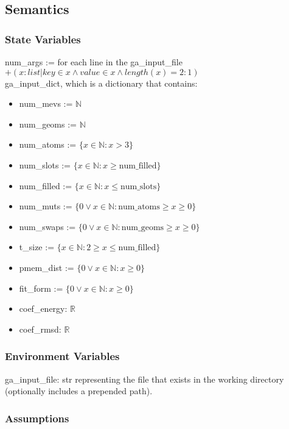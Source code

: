 \documentclass[12pt, titlepage]{article}
\begin{document}
\subsection{Semantics}

\subsubsection{State Variables}

\noindent num\_args := for each line in the ga\_input\_file $+(x : list | key 
\in x \land value \in x \land 
length(x) = 2 : 1)$ \\

\noindent ga\_input\_dict, which is a dictionary that contains:
\begin{itemize}
\item num\_mevs := $\mathbb{N}$
\item num\_geoms := $\mathbb{N}$
\item num\_atoms := $\{x \in \mathbb{N}: x > 3\}$
\item num\_slots := $\{x \in \mathbb{N}: x \geq \text{num\_filled} \}$
\item num\_filled := $\{x \in \mathbb{N}: x \leq \text{num\_slots}\}$
\item num\_muts := $\{0 \lor x \in \mathbb{N}: \text{num\_atoms} \geq x \geq 
0\}$
\item num\_swaps := $\{0 \lor x \in \mathbb{N}: \text{num\_geoms} \geq x \geq 
0\}$
\item t\_size := $\{x \in \mathbb{N}: 2 \geq x \leq \text{num\_filled} \}$
\item pmem\_dist := $\{0 \lor x \in \mathbb{N}: x \geq 0\}$
\item fit\_form := $\{0 \lor x \in \mathbb{N}: x \geq 0\}$
\item coef\_energy: $\mathbb{R}$
\item coef\_rmsd: $\mathbb{R}$
\end{itemize}

\subsubsection{Environment Variables}

ga\_input\_file: str representing the file that exists in the working directory 
(optionally includes a prepended path).

\subsubsection{Assumptions}
\end{document}
